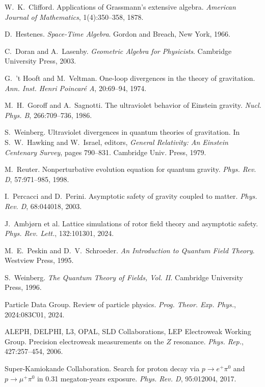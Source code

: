 \documentclass[11pt,a4paper]{article}
\numberwithin{equation}{section}
\theoremstyle{plain}
\theoremstyle{definition}
\theoremstyle{remark}
\begin{document}
\begin{thebibliography}{99}

W.~K.~Clifford.
\newblock Applications of Grassmann's extensive algebra.
\newblock \emph{American Journal of Mathematics}, 1(4):350--358, 1878.

D.~Hestenes.
\newblock \emph{Space-Time Algebra}.
\newblock Gordon and Breach, New York, 1966.

C.~Doran and A.~Lasenby.
\newblock \emph{Geometric Algebra for Physicists}.
\newblock Cambridge University Press, 2003.

G.~'t Hooft and M.~Veltman.
\newblock One-loop divergences in the theory of gravitation.
\newblock \emph{Ann. Inst. Henri Poincar\'e A}, 20:69--94, 1974.

M.~H.~Goroff and A.~Sagnotti.
\newblock The ultraviolet behavior of Einstein gravity.
\newblock \emph{Nucl. Phys. B}, 266:709--736, 1986.

S.~Weinberg.
\newblock Ultraviolet divergences in quantum theories of gravitation.
\newblock In S.~W.~Hawking and W.~Israel, editors, \emph{General Relativity: An Einstein Centenary Survey}, pages 790--831. Cambridge Univ. Press, 1979.

M.~Reuter.
\newblock Nonperturbative evolution equation for quantum gravity.
\newblock \emph{Phys. Rev. D}, 57:971--985, 1998.

I.~Percacci and D.~Perini.
\newblock Asymptotic safety of gravity coupled to matter.
\newblock \emph{Phys. Rev. D}, 68:044018, 2003.

J.~Ambj{\o}rn et al.
\newblock Lattice simulations of rotor field theory and asymptotic safety.
\newblock \emph{Phys. Rev. Lett.}, 132:101301, 2024.

M.~E.~Peskin and D.~V.~Schroeder.
\newblock \emph{An Introduction to Quantum Field Theory}.
\newblock Westview Press, 1995.

S.~Weinberg.
\newblock \emph{The Quantum Theory of Fields, Vol. II}.
\newblock Cambridge University Press, 1996.

Particle Data Group.
\newblock Review of particle physics.
\newblock \emph{Prog. Theor. Exp. Phys.}, 2024:083C01, 2024.

ALEPH, DELPHI, L3, OPAL, SLD Collaborations, LEP Electroweak Working Group.
\newblock Precision electroweak measurements on the $Z$ resonance.
\newblock \emph{Phys. Rep.}, 427:257--454, 2006.

Super-Kamiokande Collaboration.
\newblock Search for proton decay via $p\to e^+\pi^0$ and $p\to\mu^+\pi^0$ in 0.31 megaton-years exposure.
\newblock \emph{Phys. Rev. D}, 95:012004, 2017.

\end{thebibliography}
\end{document}
